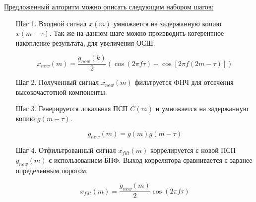 {\underline{Предложенный алгоритм можно описать следующим набором шагов:}}
\begin{itemize}
\item[Шаг 1.] Входной сигнал ${x(m)}$ умножается на задержанную копию ${x(m-\tau)}$. Так же
	на данном шаге можно производить когерентное накопление результата, для
	увеличения ОСШ.

	\begin{center}
	\begin{equation}
		x_{new}(m) = \frac{g_{new}(k)}{2} \left(\cos (2\pi f \tau) - \cos \left[2 \pi f (2m - \tau)\right]\right)
	\end{equation}
	\end{center}

\item[Шаг 2.] Полученный сигнал ${x_{new}(m)}$ фильтруется ФНЧ для отсечения высокочастотной компоненты.
\item[Шаг 3.] Генерируется локальная ПСП ${C(m)}$ и умножается на задержанную копию ${g(m-\tau)}$.

	\begin{center}
	\begin{equation}
		g_{new}(m) = g(m)g(m-\tau)
	\end{equation}
	\end{center}

\item[Шаг 4.] Отфильтрованный сигнал ${x_{filt}(m)}$ коррелируется с новой ПСП ${g_{new}(m)}$
	с использованием БПФ. Выход коррелятора сравнивается с заранее определенным порогом.

	\begin{center}
	\begin{equation}
		x_{filt}(m) = \frac{g_{new}(m)}{2} \cos (2\pi f \tau)
	\end{equation}
	\end{center}


\end{itemize}

